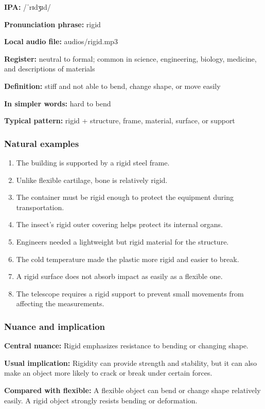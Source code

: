 \documentclass[11pt]{article}
\begin{document}
\textbf{IPA:} /ˈrɪdʒɪd/

\textbf{Pronunciation phrase:} rigid

\textbf{Local audio file:} audios/rigid.mp3

\textbf{Register:} neutral to formal; common in science, engineering, biology, medicine, and descriptions of materials

\textbf{Definition:} stiff and not able to bend, change shape, or move easily

\textbf{In simpler words:} hard to bend

\textbf{Typical pattern:} rigid + structure, frame, material, surface, or support

\subsubsection{Natural examples}
\begin{enumerate}
  \item The building is supported by a rigid steel frame.
  \item Unlike flexible cartilage, bone is relatively rigid.
  \item The container must be rigid enough to protect the equipment during transportation.
  \item The insect's rigid outer covering helps protect its internal organs.
  \item Engineers needed a lightweight but rigid material for the structure.
  \item The cold temperature made the plastic more rigid and easier to break.
  \item A rigid surface does not absorb impact as easily as a flexible one.
  \item The telescope requires a rigid support to prevent small movements from affecting the measurements.
\end{enumerate}

\subsubsection{Nuance and implication}
\textbf{Central nuance:} Rigid emphasizes resistance to bending or changing shape.

\textbf{Usual implication:} Rigidity can provide strength and stability, but it can also make an object more likely to crack or break under certain forces.

\textbf{Compared with flexible:} A flexible object can bend or change shape relatively easily. A rigid object strongly resists bending or deformation.
\end{document}
